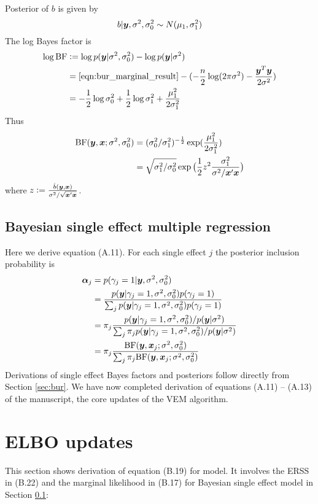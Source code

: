 Posterior of $b$ is given by
\begin{equation}
b | \bm y, \sigma^2, \sigma^2_0 \sim N(\mu_1, \sigma^2_1)
\end{equation}
The log Bayes factor is
\begin{align}
    \log \text{BF} & := \log p(\bm y|\sigma^2, \sigma^2_0) - \log p(\bm y | \sigma^2) \\
    &= \eqref{eqn:bur_marginal_result} - (-\frac{n}{2}\log(2\pi\sigma^2) - \frac{\bm y^T\bm y}{2\sigma^2}) \\
    &= - \frac{1}{2} \log \sigma^2_0 + \frac{1}{2}\log \sigma^2_1 + \frac{\mu_1^2}{2\sigma^2_1}
\end{align}
Thus 
\begin{align}
\text{BF}(\bm y, \bm x; \sigma^2, \sigma^2_0) &= (\sigma^2_0/\sigma^2_1)^{-\frac{1}{2}}\exp(\frac{\mu_1^2}{2\sigma^2_1}) \\
& = \sqrt{\sigma^2_1/\sigma^2_0}\exp{\big(\frac{1}{2}z^2\frac{\sigma^2_1}{\sigma^2/\bm x'\bm x}\big)} 
\end{align}
where $z:=\frac{\hat{b}(\bm y, \bm x)}{\sigma^2/\sqrt{\bm x'\bm x}}$.

\subsection{Bayesian single effect multiple regression} \label{sec:bser}

Here we derive equation (A.11). For each single effect $j$ the posterior inclusion probability is
\begin{align}
    \bm \alpha_j &= p(\gamma_j = 1 | \bm y, \sigma^2, \sigma^2_0) \\
    &= \frac{p(\bm y | \gamma_j = 1, \sigma^2, \sigma^2_0)p(\gamma_j=1)}{\sum_j p(\bm y | \gamma_j = 1, \sigma^2, \sigma^2_0)p(\gamma_j=1)} \\
    &= \pi_j \frac{p(\bm y | \gamma_j = 1, \sigma^2, \sigma^2_0) / p(\bm y|\sigma^2)}{\sum_j \pi_j p(\bm y | \gamma_j = 1, \sigma^2, \sigma^2_0) / p(\bm y | \sigma^2)} \\
    &= \pi_j \frac{\text{BF}(\bm y, \bm x_j; \sigma^2, \sigma^2_0)}{\sum_j \pi_j \text{BF}(\bm y, \bm x_j; \sigma^2, \sigma^2_0)} \label{eqn:ser alpha}
\end{align}
Derivations of single effect Bayes factors and posteriors follow directly from Section \ref{sec:bur}. We have now completed derivation of equations (A.11) -- (A.13) of the manuscript, the core updates of the \susie VEM algorithm.

\section{ELBO updates}

This section shows derivation of equation (B.19) for \susie model. It involves the ERSS in (B.22) and the marginal likelihood in (B.17) for Bayesian single effect model in Section \ref{sec:bser}: 


